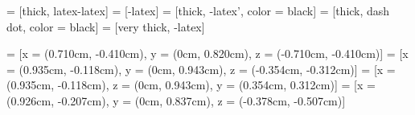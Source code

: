 
 = [thick, latex-latex]              %
 = [-latex]                           %
 = [thick, -latex', color = black]     %
 = [thick, dash dot, color = black] %
 = [very thick, -latex]              %


 = [x = {(0.710cm, -0.410cm)}, y = {(0cm, 0.820cm)}, z = {(-0.710cm, -0.410cm)}]
 = [x = {(0.935cm, -0.118cm)}, y = {(0cm, 0.943cm)}, z = {(-0.354cm, -0.312cm)}]
 = [x = {(0.935cm, -0.118cm)}, z = {(0cm, 0.943cm)}, y = {(0.354cm, 0.312cm)}]
 = [x = {(0.926cm, -0.207cm)}, y = {(0cm, 0.837cm)}, z = {(-0.378cm, -0.507cm)}]





\renewcommand{\labelitemi}{\normalfont\bfseries{--}}

